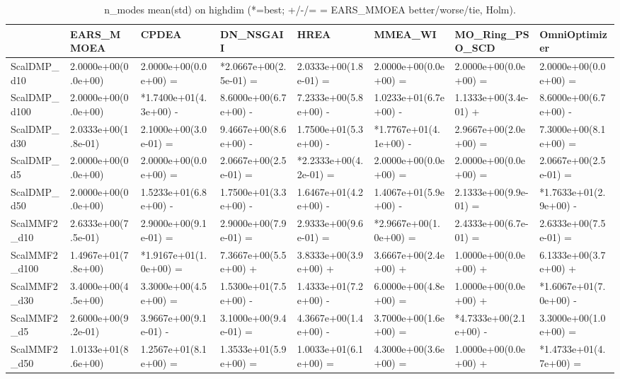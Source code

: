 \begin{table}[t]
\centering
\caption{n_modes mean(std) on highdim (*=best; +/-/= = EARS_MMOEA better/worse/tie, Holm).}
\label{tab:highdim_n_modes}
\begin{tabular}{llllllll}
\toprule
 & EARS\_MMOEA & CPDEA & DN\_NSGAII & HREA & MMEA\_WI & MO\_Ring\_PSO\_SCD & OmniOptimizer \\
\midrule
ScalDMP\_d10 & 2.0000e+00(0.0e+00) & 2.0000e+00(0.0e+00) = & *2.0667e+00(2.5e-01) = & 2.0333e+00(1.8e-01) = & 2.0000e+00(0.0e+00) = & 2.0000e+00(0.0e+00) = & 2.0000e+00(0.0e+00) = \\
ScalDMP\_d100 & 2.0000e+00(0.0e+00) & *1.7400e+01(4.3e+00) - & 8.6000e+00(6.7e+00) - & 7.2333e+00(5.8e+00) - & 1.0233e+01(6.7e+00) - & 1.1333e+00(3.4e-01) + & 8.6000e+00(6.7e+00) - \\
ScalDMP\_d30 & 2.0333e+00(1.8e-01) & 2.1000e+00(3.0e-01) = & 9.4667e+00(8.6e+00) - & 1.7500e+01(5.3e+00) - & *1.7767e+01(4.1e+00) - & 2.9667e+00(2.0e+00) = & 7.3000e+00(8.1e+00) = \\
ScalDMP\_d5 & 2.0000e+00(0.0e+00) & 2.0000e+00(0.0e+00) = & 2.0667e+00(2.5e-01) = & *2.2333e+00(4.2e-01) = & 2.0000e+00(0.0e+00) = & 2.0000e+00(0.0e+00) = & 2.0667e+00(2.5e-01) = \\
ScalDMP\_d50 & 2.0000e+00(0.0e+00) & 1.5233e+01(6.8e+00) - & 1.7500e+01(3.3e+00) - & 1.6467e+01(4.2e+00) - & 1.4067e+01(5.9e+00) - & 2.1333e+00(9.9e-01) = & *1.7633e+01(2.9e+00) - \\
ScalMMF2\_d10 & 2.6333e+00(7.5e-01) & 2.9000e+00(9.1e-01) = & 2.9000e+00(7.9e-01) = & 2.9333e+00(9.6e-01) = & *2.9667e+00(1.0e+00) = & 2.4333e+00(6.7e-01) = & 2.6333e+00(7.5e-01) = \\
ScalMMF2\_d100 & 1.4967e+01(7.8e+00) & *1.9167e+01(1.0e+00) = & 7.3667e+00(5.5e+00) + & 3.8333e+00(3.9e+00) + & 3.6667e+00(2.4e+00) + & 1.0000e+00(0.0e+00) + & 6.1333e+00(3.7e+00) + \\
ScalMMF2\_d30 & 3.4000e+00(4.5e+00) & 3.3000e+00(4.5e+00) = & 1.5300e+01(7.5e+00) - & 1.4333e+01(7.2e+00) - & 6.0000e+00(4.8e+00) = & 1.0000e+00(0.0e+00) + & *1.6067e+01(7.0e+00) - \\
ScalMMF2\_d5 & 2.6000e+00(9.2e-01) & 3.9667e+00(9.1e-01) - & 3.1000e+00(9.4e-01) = & 4.3667e+00(1.4e+00) - & 3.7000e+00(1.6e+00) = & *4.7333e+00(2.1e+00) - & 3.3000e+00(1.0e+00) = \\
ScalMMF2\_d50 & 1.0133e+01(8.6e+00) & 1.2567e+01(8.1e+00) = & 1.3533e+01(5.9e+00) = & 1.0033e+01(6.1e+00) = & 4.3000e+00(3.6e+00) = & 1.0000e+00(0.0e+00) + & *1.4733e+01(4.7e+00) = \\
\bottomrule
\end{tabular}
\end{table}
